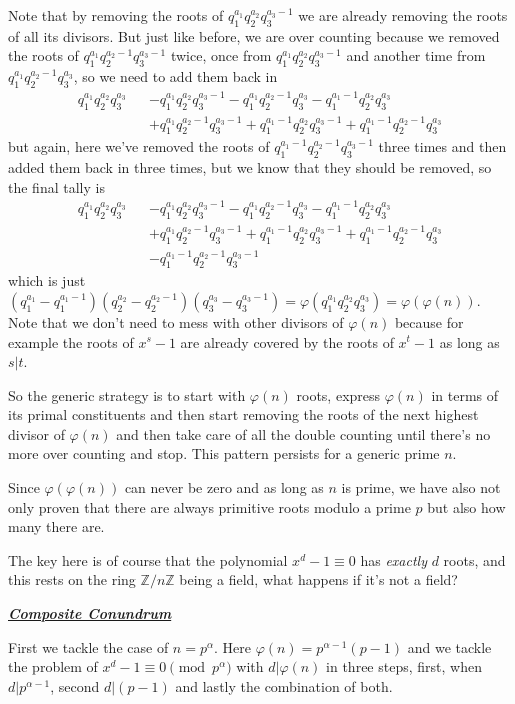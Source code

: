 \documentclass[aps,preprint,preprintnumbers,nofootinbib,showpacs,prd]{revtex4-1}
\newcommand{\nbea}{\begin{eqnarray*}}
\newcommand{\neea}{\end{eqnarray*}}
\begin{document}
Note that by removing the roots of $q_1^{a_1}q_2^{a_2}q_3^{a_3-1}$ we are already removing the roots of all its divisors. But just like before, we are over counting because we removed the roots of $q_1^{a_1}q_2^{a_2-1}q_3^{a_3-1}$ twice, once from $q_1^{a_1}q_2^{a_2}q_3^{a_3-1}$ and another time from $q_1^{a_1}q_2^{a_2-1}q_3^{a_3}$, so we need to add them back in
%
\nbea
q_1^{a_1}q_2^{a_2}q_3^{a_3} &&  - q_1^{a_1}q_2^{a_2}q_3^{a_3-1} - q_1^{a_1}q_2^{a_2-1}q_3^{a_3}- q_1^{a_1-1}q_2^{a_2}q_3^{a_3} \\
&& + q_1^{a_1}q_2^{a_2-1}q_3^{a_3-1} + q_1^{a_1-1}q_2^{a_2}q_3^{a_3-1} + q_1^{a_1-1}q_2^{a_2-1}q_3^{a_3}
\neea
%
but again, here we've removed the roots of $q_1^{a_1-1}q_2^{a_2-1}q_3^{a_3-1}$ three times and then added them back in three times, but we know that they should be removed, so the final tally is
%
\nbea
q_1^{a_1}q_2^{a_2}q_3^{a_3} &&  - q_1^{a_1}q_2^{a_2}q_3^{a_3-1} - q_1^{a_1}q_2^{a_2-1}q_3^{a_3}- q_1^{a_1-1}q_2^{a_2}q_3^{a_3} \\
&& + q_1^{a_1}q_2^{a_2-1}q_3^{a_3-1} + q_1^{a_1-1}q_2^{a_2}q_3^{a_3-1} + q_1^{a_1-1}q_2^{a_2-1}q_3^{a_3} \\
&& -q_1^{a_1-1}q_2^{a_2-1}q_3^{a_3-1}
\neea
%
which is just $(q_1^{a_1} - q_1^{a_1-1})(q_2^{a_2}-q_2^{a_2-1})(q_3^{a_3} - q_3^{a_3-1}) =\varphi(q_1^{a_1}q_2^{a_2}q_3^{a_3}) = \varphi(\varphi(n))$. Note that we don't need to mess with other divisors of $\varphi(n)$ because for example the roots of $x^s - 1$ are already covered by the roots of $x^t - 1$ as long as $s|t$.

So the generic strategy is to start with $\varphi(n)$ roots, express $\varphi(n)$ in terms of its primal constituents and then start removing the roots of the next highest divisor of $\varphi(n)$ and then take care of all the double counting until there's no more over counting and stop. This pattern persists for a generic prime $n$.

Since $\varphi(\varphi(n))$ can never be zero and as long as $n$ is prime, we have also not only proven that there are always primitive roots modulo a prime $p$ but also how many there are.

The key here is of course that the polynomial $x^d - 1 \equiv 0$ has {\it exactly} $d$ roots, and this rests on the ring $\mathbb{Z}/n\mathbb{Z}$ being a field, what happens if it's not a field?

\bigskip
\underline{\textit{\textbf{Composite Conundrum}}}
\bigskip

First we tackle the case of $n = p^\alpha$. Here $\varphi(n) = p^{\alpha-1}(p-1)$ and we tackle the problem of $x^d - 1\equiv 0 \pmod{p^\alpha}$ with $d|\varphi(n)$ in three steps, first, when $d|p^{\alpha-1}$, second $d|(p-1)$ and lastly the combination of both.
\end{document}
